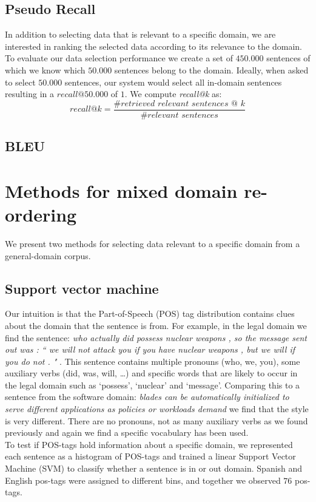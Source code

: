 \documentclass[11pt]{article}
\begin{document}
\subsection{Pseudo Recall}
In addition to selecting data that is relevant to a specific domain, we are interested in ranking the selected data according to its relevance to the domain. To evaluate our data selection performance we create a set of $450.000$ sentences of which we know which $50.000$ sentences belong to the domain. Ideally, when asked to select $50.000$ sentences, our system would select all in-domain sentences resulting in a $\textit{recall@}50.000$ of $1$. We compute \textit{recall@k} as: 
$$ \textit{recall@k} = \frac{\textit{\# retrieved relevant sentences @ k}}{\textit{\# relevant sentences}} $$
\subsection{BLEU}

\section{Methods for mixed domain re-ordering}
\label{sec:methods}
We present two methods for selecting data relevant to a specific domain from a general-domain corpus.

\subsection{Support vector machine}
Our intuition is that the Part-of-Speech (POS) tag distribution contains clues about the domain that the sentence is from. For example, in the legal domain we find the sentence: \textit{who actually did possess nuclear weapons , so the message sent out was : `` we will not attack you if you have nuclear weapons , but we will if you do not . " }. This sentence contains multiple pronouns (who, we, you), some auxiliary verbs (did, was, will, \dots) and specific words that are likely to occur in the legal domain such as `possess', `nuclear' and `message'. Comparing this to a sentence from the software domain: 
\textit{blades can be automatically initialized to serve different applications as policies or workloads demand} we find that the style is very different. There are no pronouns, not as many auxiliary verbs as we found previously and again we find a specific vocabulary has been used.\\

To test if POS-tags hold information about a specific domain, we represented each sentence as a histogram of POS-tags and trained a linear Support Vector Machine (SVM) to classify whether a sentence is in or out domain. Spanish and English pos-tags were assigned to different bins, and together we observed $76$ pos-tags.
\end{document}

